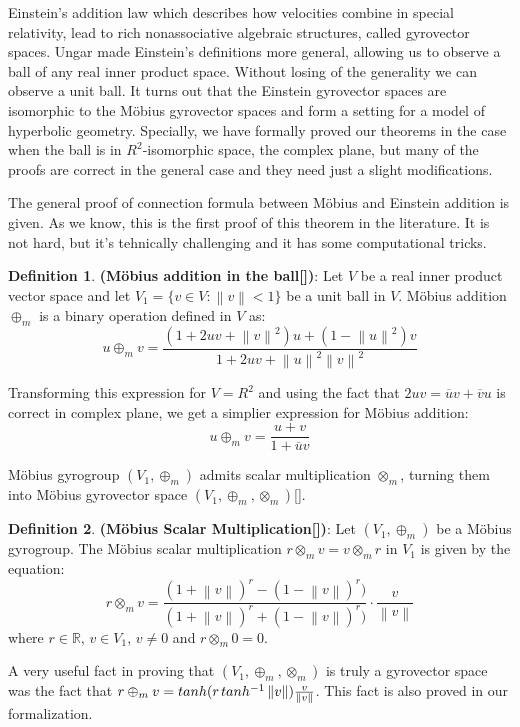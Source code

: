 \documentclass[a4paper]{article}
\theoremstyle{definition}
\newtheorem{definition}{Definition}[section]
\newcommand{\norm}[1]{\left\lVert#1\right\rVert}
\begin{document}
Einstein's addition law which describes how velocities combine in
special relativity, lead to rich nonassociative algebraic structures,
called gyrovector spaces. Ungar made Einstein's definitions more
general, allowing us to observe a ball of any real inner product
space. Without losing of the generality we can observe a unit ball. It
turns out that the Einstein gyrovector spaces are isomorphic to the
M\" obius gyrovector spaces and form a setting for a model of
hyperbolic geometry. Specially, we have formally proved our theorems
in the case when the ball is in $R^2$-isomorphic space, the complex
plane, but many of the proofs are correct in the general case and they
need just a slight modifications.

The general proof of connection formula between M\" obius and Einstein addition is given. As we know, this is the first proof of this theorem in the literature. It is not hard, but it's tehnically challenging and it has some computational tricks. 

\begin{definition}\textbf{(M\" obius addition in the ball[])}: Let $V$ be a real inner product vector space and let $V_1 = \{v\in V: \norm{v}<1\}$ be a unit ball in $V$. M\" obius addition $\oplus_m$ is a binary operation defined in $V$ as:
$$u \oplus_m v = \frac{(1+2uv+\norm{v}^2)u+(1-\norm{u}^2)v}{1+2uv+\norm{u}^2\norm{v}^2}$$ 
\end{definition}

Transforming this expression for $V=R^2$ and using the fact that $2uv = \overline{u}v+\overline{v}u$ is correct in complex plane, we get a simplier expression for M\" obius addition:
$$u\oplus_m v = \frac{u+v}{1+\overline{u}v}$$

M\" obius gyrogroup $(V_1, \oplus_m)$ admits scalar multiplication $\otimes_m$, turning them into M\" obius gyrovector space $(V_1, \oplus_m, \otimes_m)$[]. 
\begin{definition}\textbf{(M\" obius Scalar Multiplication[])}: Let $(V_1, \oplus_m)$ be a M\" obius gyrogroup. The M\" obius scalar multiplication $r\otimes_m v = v\otimes_m r$ in $V_1$ is given by the equation:
$$r\otimes_m v = \frac{(1+\norm{v})^r - (1-\norm{v})^r)}{(1+\norm{v})^r + (1-\norm{v})^r)}\cdot\frac{v}{\norm{v}}$$
where $r\in \mathbb{R}$, $v\in V_1$, $v\neq 0$ and $r\otimes_m 0 = 0$.
\end{definition}

A very useful fact in proving that $(V_1, \oplus_m, \otimes_m)$ is truly a gyrovector space was the fact that $r\oplus_m v = tanh(r\hspace{0.5mm}tanh^{-1}\norm{v})\frac{v}{\norm{v}}$. This fact is also proved in our formalization.
\end{document}
